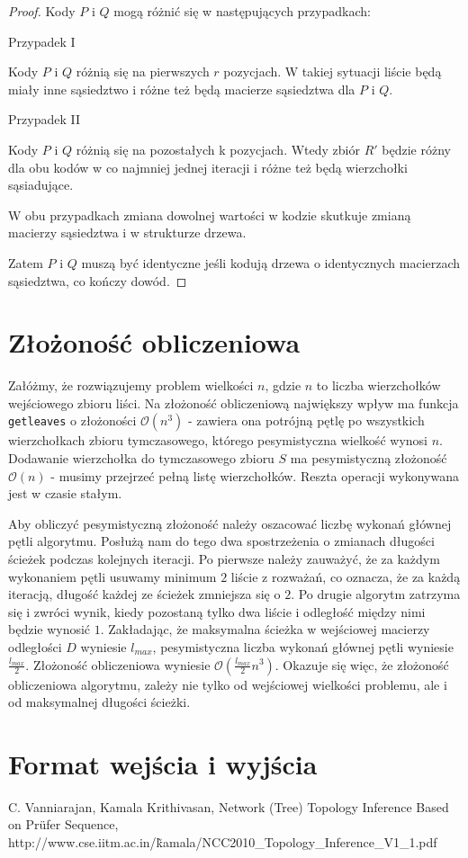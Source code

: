 \documentclass[a4paper,12p]{article}
\begin{document}
\begin{proof}
Kody $P$ i $Q$ mogą różnić się w następujących przypadkach:

Przypadek I

Kody $P$ i $Q$ różnią się na pierwszych $r$ pozycjach. W takiej sytuacji liście będą miały inne sąsiedztwo i różne też będą macierze sąsiedztwa dla $P$ i $Q$.

Przypadek II

Kody $P$ i $Q$ różnią się na pozostałych k pozycjach. Wtedy zbiór $R'$ będzie różny dla obu kodów w co najmniej jednej iteracji i różne też będą wierzchołki sąsiadujące.

W obu przypadkach zmiana dowolnej wartości w kodzie skutkuje zmianą macierzy sąsiedztwa i w strukturze drzewa.

Zatem $P$ i $Q$ muszą być identyczne jeśli kodują drzewa o identycznych macierzach sąsiedztwa, co kończy dowód.
\end{proof}


\section{Złożoność obliczeniowa}

Załóżmy, że rozwiązujemy problem wielkości $n$, gdzie $n$ to liczba wierzchołków wejściowego zbioru liści. Na złożoność obliczeniową największy wpływ ma funkcja \texttt{getleaves} o złożoności $\mathcal{O}(n^3)$ - zawiera ona potrójną pętlę po wszystkich wierzchołkach zbioru tymczasowego, którego pesymistyczna wielkość wynosi $n$. Dodawanie wierzchołka do tymczasowego zbioru $S$ ma pesymistyczną złożoność $\mathcal{O}(n)$ - musimy przejrzeć pełną listę wierzchołków. Reszta operacji wykonywana jest w czasie stałym.

Aby obliczyć pesymistyczną złożoność należy oszacować liczbę wykonań głównej pętli algorytmu. Posłużą nam do tego dwa spostrzeżenia o zmianach długości ścieżek podczas kolejnych iteracji. Po pierwsze należy zauważyć, że za każdym wykonaniem pętli usuwamy minimum $2$ liście z rozważań, co oznacza, że za każdą iteracją, długość każdej ze ścieżek zmniejsza się o $2$. Po drugie algorytm zatrzyma się i zwróci wynik, kiedy pozostaną tylko dwa liście i odległość między nimi będzie wynosić $1$. Zakładając, że maksymalna ścieżka w wejściowej macierzy odległości $D$ wyniesie $l_{max}$, pesymistyczna liczba wykonań głównej pętli wyniesie $\frac{l_{max}}{2}$. Złożoność obliczeniowa wyniesie $\mathcal{O}(\frac{l_{max}}{2} n^3)$. Okazuje się więc, że złożoność obliczeniowa algorytmu, zależy nie tylko od wejściowej wielkości problemu, ale i od maksymalnej długości ścieżki.

\section{Format wejścia i wyjścia}

\newpage

\begin{thebibliography}{1}
 C. Vanniarajan, Kamala Krithivasan, Network (Tree) Topology Inference Based on Prüfer Sequence, http://www.cse.iitm.ac.in/\~kamala/NCC2010\_Topology\_Inference\_V1\_1.pdf
\end{thebibliography}
\end{document}
